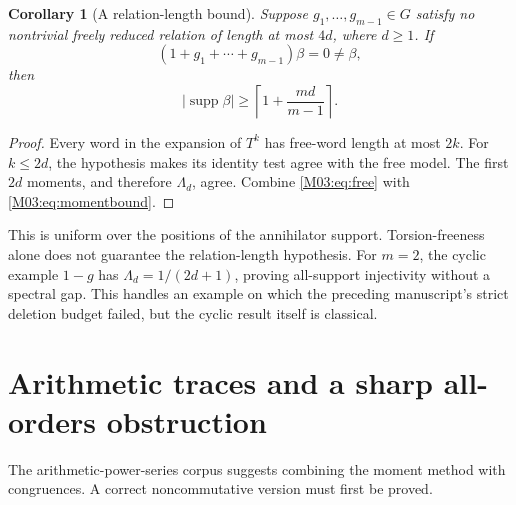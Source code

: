 \documentclass[11pt,a4paper,oneside]{report}
\newtheorem{corollary}[theorem]{Corollary}
\theoremstyle{definition}
\theoremstyle{remark}
\DeclareMathOperator{\supp}{supp}
\begin{document}
\begin{corollary}[A relation-length bound]\label{M03:cor:relations}
Suppose \(g_1,\ldots,g_{m-1}\in G\) satisfy no nontrivial freely reduced relation of length at most \(4d\), where \(d\ge1\). If
\[
(1+g_1+\cdots+g_{m-1})\beta=0\ne\beta,
\]
then
\begin{equation}\label{M03:eq:relations}
|\supp\beta|\ge\left\lceil1+\frac{md}{m-1}\right\rceil.
\end{equation}
\end{corollary}
\begin{proof}
Every word in the expansion of \(T^k\) has free-word length at most \(2k\). For \(k\le2d\), the hypothesis makes its identity test agree with the free model. The first \(2d\) moments, and therefore \(\Lambda_d\), agree. Combine \eqref{M03:eq:free} with \eqref{M03:eq:momentbound}.
\end{proof}
This is uniform over the positions of the annihilator support. Torsion-freeness alone does not guarantee the relation-length hypothesis. For \(m=2\), the cyclic example \(1-g\) has \(\Lambda_d=1/(2d+1)\), proving all-support injectivity without a spectral gap. This handles an example on which the preceding manuscript's strict deletion budget failed, but the cyclic result itself is classical.

\section{Arithmetic traces and a sharp all-orders obstruction}\label{M03:sec:witt}
The arithmetic-power-series corpus suggests combining the moment method with congruences. A correct noncommutative version must first be proved.
\end{document}
